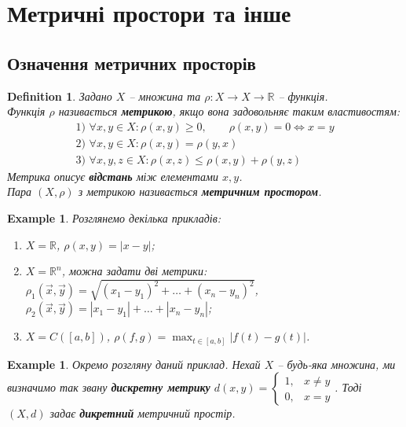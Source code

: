 \documentclass[a4paper, 10pt]{article}
\theoremstyle{theoremdd}
\theoremstyle{theoremdd}
\newtheorem{definition}[theorem]{Definition}
\theoremstyle{theoremdd}
\theoremstyle{theoremdd}
\newtheorem{example}[theorem]{Example}
\theoremstyle{theoremdd}
\theoremstyle{theoremdd}
\theoremstyle{theoremdd}
\theoremstyle{theoremdd}
\begin{document}
\tableofcontents
\newpage

\section{Метричні простори та інше}
\subsection{Означення метричних просторів}
\begin{definition}
Задано $X$ -- множина та $\rho \colon X \to X \to \mathbb{R}$ -- функція.\\
Функція $\rho$ називається \textbf{метрикою}, якщо вона задовольняє таким властивостям:
\begin{align*}
\text{1) } \forall x,y \in X: \rho(x,y) \geq 0 ,\qquad \rho(x,y) = 0 \iff x = y \\
\text{2) } \forall x,y \in X: \rho(x,y) = \rho(y,x) \\
\text{3) } \forall x,y,z \in X: \rho(x,z) \leq \rho(x,y) + \rho(y,z)
\end{align*}
Метрика описує \textbf{відстань} між елементами $x,y$. \\
Пара $(X,\rho)$ з метрикою називається \textbf{метричним простором}.
\end{definition}


\begin{example}
Розглянемо декілька прикладів:
\begin{enumerate}[nosep,wide=0pt,label={\arabic*)}]
\item $X = \mathbb{R}$, \qquad $\rho(x,y) = |x-y|$;
\item $X = \mathbb{R}^n$, можна задати дві метрики: \\
$\rho_1(\vec{x}, \vec{y}) = \sqrt{(x_1-y_1)^2 + \dots + (x_n-y_n)^2}$, \qquad $\rho_2(\vec{x}, \vec{y}) = |x_1-y_1|+\dots+|x_n-y_n|$;
\item $X = C([a,b])$, \qquad $\displaystyle \rho(f,g) = \max_{t \in [a,b]} |f(t)-g(t)|$.
\end{enumerate}
\end{example}

\begin{example}
Окремо розгляну даний приклад. Нехай $X$ -- будь-яка множина, ми визначимо так звану \textbf{дискретну метрику} $d(x,y) = \begin{cases} 1, & x \neq y \\ 0, & x = y \end{cases}$. Тоді $(X,d)$ задає \textbf{дикретний} метричний простір.
\end{example}
\end{document}

